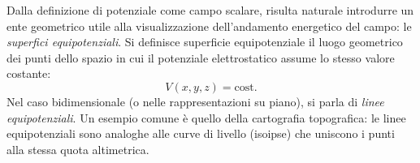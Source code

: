 \documentclass[a4paper,11pt]{report}
\begin{document}
\begin{approfondimento}[title={Superfici (o Linee) Equipotenziali}]
\noindent
Dalla definizione di potenziale come campo scalare, risulta naturale introdurre un ente geometrico utile alla visualizzazione dell'andamento energetico del campo: le \textit{superfici equipotenziali}.
Si definisce superficie equipotenziale il luogo geometrico dei punti dello spazio in cui il potenziale elettrostatico assume lo stesso valore costante:
\begin{equation}
    V(x, y, z) = \text{cost}.
\end{equation}
Nel caso bidimensionale (o nelle rappresentazioni su piano), si parla di \textit{linee equipotenziali}. Un esempio comune è quello della cartografia topografica: le linee equipotenziali sono analoghe alle curve di livello (isoipse) che uniscono i punti alla stessa quota altimetrica. 

\begin{center}
\end{center}
\end{approfondimento}
\end{document}
